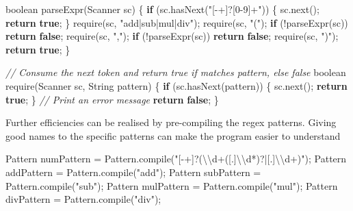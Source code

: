 \documentclass[
]{book}
\newenvironment{Shaded}{\begin{snugshade}}{\end{snugshade}}
\newcommand{\BuiltInTok}[1]{#1}
\newcommand{\CommentTok}[1]{\textcolor[rgb]{0.56,0.35,0.01}{\textit{#1}}}
\newcommand{\DataTypeTok}[1]{\textcolor[rgb]{0.13,0.29,0.53}{#1}}
\newcommand{\FunctionTok}[1]{\textcolor[rgb]{0.00,0.00,0.00}{#1}}
\newcommand{\KeywordTok}[1]{\textcolor[rgb]{0.13,0.29,0.53}{\textbf{#1}}}
\newcommand{\NormalTok}[1]{#1}
\newcommand{\SpecialCharTok}[1]{\textcolor[rgb]{0.00,0.00,0.00}{#1}}
\newcommand{\StringTok}[1]{\textcolor[rgb]{0.31,0.60,0.02}{#1}}
\begin{document}
\begin{Shaded}
\begin{Highlighting}[]
\DataTypeTok{boolean} \FunctionTok{parseExpr}\NormalTok{(}\BuiltInTok{Scanner}\NormalTok{ sc) \{}
  \KeywordTok{if}\NormalTok{ (sc.}\FunctionTok{hasNext}\NormalTok{(}\StringTok{"[{-}+]?[0{-}9]+"}\NormalTok{)) \{}
\NormalTok{    sc.}\FunctionTok{next}\NormalTok{();}
    \KeywordTok{return} \KeywordTok{true}\NormalTok{;}
\NormalTok{  \}}
  \FunctionTok{require}\NormalTok{(sc, }\StringTok{"add|sub|mul|div"}\NormalTok{);}
  \FunctionTok{require}\NormalTok{(sc, }\StringTok{"("}\NormalTok{);}
  \KeywordTok{if}\NormalTok{ (!}\FunctionTok{parseExpr}\NormalTok{(sc))}
    \KeywordTok{return} \KeywordTok{false}\NormalTok{;}
  \FunctionTok{require}\NormalTok{(sc, }\StringTok{","}\NormalTok{);}
  \KeywordTok{if}\NormalTok{ (!}\FunctionTok{parseExpr}\NormalTok{(sc))}
    \KeywordTok{return} \KeywordTok{false}\NormalTok{;}
  \FunctionTok{require}\NormalTok{(sc, }\StringTok{")"}\NormalTok{);}
  \KeywordTok{return} \KeywordTok{true}\NormalTok{;}
\NormalTok{\}}

\CommentTok{// Consume the next token and return true if matches pattern, else false}
\DataTypeTok{boolean} \FunctionTok{require}\NormalTok{(}\BuiltInTok{Scanner}\NormalTok{ sc, }\BuiltInTok{String}\NormalTok{ pattern) \{}
  \KeywordTok{if}\NormalTok{ (sc.}\FunctionTok{hasNext}\NormalTok{(pattern)) \{}
\NormalTok{    sc.}\FunctionTok{next}\NormalTok{();}
    \KeywordTok{return} \KeywordTok{true}\NormalTok{;}
\NormalTok{  \}}
  \CommentTok{// Print an error message}
  \KeywordTok{return} \KeywordTok{false}\NormalTok{;}
\NormalTok{\}}
\end{Highlighting}
\end{Shaded}

Further efficiencies can be realised by pre-compiling the regex patterns. Giving good names to the specific patterns can make the program easier to understand

\begin{Shaded}
\begin{Highlighting}[]
\BuiltInTok{Pattern}\NormalTok{ numPattern = }\BuiltInTok{Pattern}\NormalTok{.}\FunctionTok{compile}\NormalTok{(}\StringTok{"[{-}+]?(}\SpecialCharTok{\textbackslash{}\textbackslash{}}\StringTok{d+([.]}\SpecialCharTok{\textbackslash{}\textbackslash{}}\StringTok{d*)?|[.]}\SpecialCharTok{\textbackslash{}\textbackslash{}}\StringTok{d+)"}\NormalTok{);}
\BuiltInTok{Pattern}\NormalTok{ addPattern = }\BuiltInTok{Pattern}\NormalTok{.}\FunctionTok{compile}\NormalTok{(}\StringTok{"add"}\NormalTok{);}
\BuiltInTok{Pattern}\NormalTok{ subPattern = }\BuiltInTok{Pattern}\NormalTok{.}\FunctionTok{compile}\NormalTok{(}\StringTok{"sub"}\NormalTok{);}
\BuiltInTok{Pattern}\NormalTok{ mulPattern = }\BuiltInTok{Pattern}\NormalTok{.}\FunctionTok{compile}\NormalTok{(}\StringTok{"mul"}\NormalTok{);}
\BuiltInTok{Pattern}\NormalTok{ divPattern = }\BuiltInTok{Pattern}\NormalTok{.}\FunctionTok{compile}\NormalTok{(}\StringTok{"div"}\NormalTok{);}
\end{Highlighting}
\end{Shaded}
\end{document}
